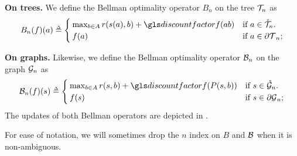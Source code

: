 \begin{definition}
	\begin{leftbar}[defnbar]
	\label{def:bellman}
	{\textbf{On trees.}} We define the Bellman optimality operator $B_n$ on the tree $\mathcal{T}_n$ as
	\begin{equation}
	\label{eq:bellman-tree}
	B_n(f)(a) \eqdef \begin{cases}
	\max_{b\in A} r(s(a), b) + \discount f({ab})
	& \text{if $a\in\inte{\Tau}_n$.} \\
	f(a) & \text{if $a\in\ext{\Tau}_n$;}
	\end{cases}
	\end{equation}
	
	{\textbf{On graphs.}} Likewise, we define the Bellman optimality operator $\mathcal{B}_n$ on the graph $\mathcal{G}_n$ as
	\begin{equation}
	\label{eq:bellman-graph}
	\cB_n(f)(s) \eqdef \begin{cases}
	\max_{b\in A} r(s, b) + \discount f(P(s,b))
	& \text{if $s\in\inte{\cG}_n$.} \\
	f(s) & \text{if $s\in\ext{\cG}_n$;}
	\end{cases}
	\end{equation}
	The updates of both Bellman operators are depicted in .
	\end{leftbar}
\end{definition}

\begin{remark}
	\begin{leftbar}[remarkbar]
	For ease of notation, we will sometimes drop the $n$ index on $B$ and $\mathcal{B}$ when it is non-ambiguous.
	\end{leftbar}
\end{remark}


